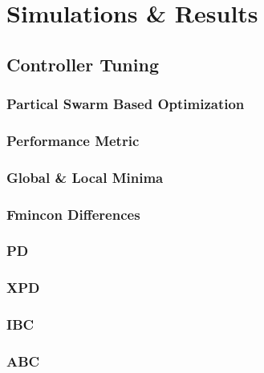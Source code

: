 \chapter{Simulations \& Results}
\label{ch:simulation}
\section{Controller Tuning}
\label{sec:simulation.tuning}
\subsection{Partical Swarm Based Optimization}
\label{subsec:simulation.tuning.pso}
\subsection{Performance Metric}
\label{subsec:simulation.tuning.metric}
\subsection{Global \& Local Minima}
\subsection{Fmincon Differences}
\subsection{PD}
\subsection{XPD}
\subsection{IBC}
\subsection{ABC}
